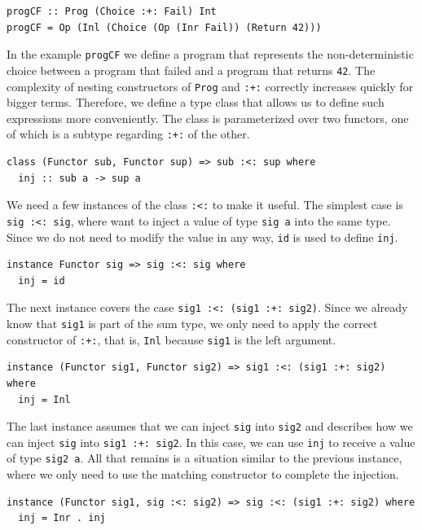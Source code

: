 \documentclass[a4paper, 11pt, fleqn, twoside]{scrreprt}
\newcommand{\hinl}[1]{\texttt{#1}}
\begin{document}
\begin{verbatim}
progCF :: Prog (Choice :+: Fail) Int
progCF = Op (Inl (Choice (Op (Inr Fail)) (Return 42)))
\end{verbatim}

In the example \hinl{progCF} we define a program that represents the non-deterministic choice between a program that failed and a program that returns \hinl{42}.
The complexity of nesting constructors of \hinl{Prog} and \hinl{:+:} correctly increases quickly for bigger terms.
Therefore, we define a type class that allows us to define such expressions more conveniently.
The class is parameterized over two functors, one of which is a subtype regarding \hinl{:+:} of the other.

\begin{verbatim}
class (Functor sub, Functor sup) => sub :<: sup where
  inj :: sub a -> sup a
\end{verbatim}

We need a few instances of the class \hinl{:<:} to make it useful.
The simplest case is \hinl{sig :<: sig}, where want to inject a value of type \hinl{sig a} into the same type.
Since we do not need to modify the value in any way, \hinl{id} is used to define \hinl{inj}.

\begin{verbatim}
instance Functor sig => sig :<: sig where
  inj = id  
\end{verbatim}

The next instance covers the case \hinl{sig1 :<: (sig1 :+: sig2)}.
Since we already know that \hinl{sig1} is part of the sum type, we only need to apply the correct constructor of \hinl{:+:}, that is, \hinl{Inl} because \hinl{sig1} is the left argument.

\begin{verbatim}
instance (Functor sig1, Functor sig2) => sig1 :<: (sig1 :+: sig2) where
  inj = Inl
\end{verbatim}

The last instance assumes that we can inject \hinl{sig} into \hinl{sig2} and describes how we can inject \hinl{sig} into \hinl{sig1 :+: sig2}.
In this case, we can use \hinl{inj} to receive a value of type \hinl{sig2 a}.
All that remains is a situation similar to the previous instance, where we only need to use the matching constructor to complete the injection.
 
\begin{verbatim}
instance (Functor sig1, sig :<: sig2) => sig :<: (sig1 :+: sig2) where
  inj = Inr . inj
\end{verbatim}
\end{document}
